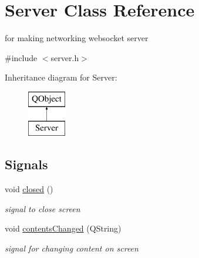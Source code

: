\hypertarget{classServer}{\section{Server Class Reference}
\label{classServer}
}


for making networking websocket server  




{\ttfamily \#include $<$server.\-h$>$}

Inheritance diagram for Server\-:\begin{figure}[H]
\begin{center}
\leavevmode
\includegraphics[height=2.000000cm]{classServer}
\end{center}
\end{figure}
\subsection*{Signals}
\begin{DoxyCompactItemize}
\item 
\hypertarget{classServer_a67295c05cd7776a05d4d26f3872b97d1}{void \hyperlink{classServer_a67295c05cd7776a05d4d26f3872b97d1}{closed} ()}\label{classServer_a67295c05cd7776a05d4d26f3872b97d1}

\begin{DoxyCompactList}\small\item\em signal to close screen \end{DoxyCompactList}\item 
\hypertarget{classServer_a064bb50dac3db0c39d99b512942251c7}{void \hyperlink{classServer_a064bb50dac3db0c39d99b512942251c7}{contents\-Changed} (Q\-String)}\label{classServer_a064bb50dac3db0c39d99b512942251c7}

\begin{DoxyCompactList}\small\item\em signal for changing content on screen \end{DoxyCompactList}\end{DoxyCompactItemize}
